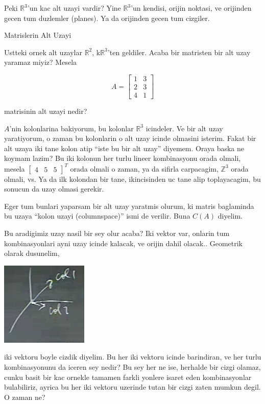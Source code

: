 \documentclass[12pt,fleqn]{article}\usepackage{../common}
\begin{document}
Peki $\mathbb{R}^3$'un kac alt uzayi vardir? Yine $\mathbb{R}^3$'un
kendisi, orijin noktasi, ve orijinden gecen tum duzlemler (planes). Ya da
orijinden gecen tum cizgiler. 

Matrislerin Alt Uzayi

Ustteki ornek alt uzaylar $\mathbb{R}^2$, k$\mathbb{R}^3$'ten
geldiler. Acaba bir matristen bir alt uzay yaramaz miyiz? Mesela 

$$  A =
\left[\begin{array}{rr}
1 & 3 \\
2 & 3 \\
4 & 1 
\end{array}\right]
 $$

matrisinin alt uzayi nedir? 

$A$'nin kolonlarina bakiyorum, bu kolonlar $\mathbb{R}^3$ icindeler. Ve bir
alt uzay yaratiyorum, o zaman bu kolonlarin o alt uzay icinde olmasini
isterim. Fakat bir alt uzaya iki tane kolon atip ``iste bu bir alt uzay''
diyemem. Oraya baska ne koymam lazim? Bu iki kolonun her turlu lineer
kombinasyonu orada olmali, mesela $ \left[\begin{array}{rrr}4 & 5 &
    5\end{array}\right]^T$ orada olmali o zaman, ya da sifirla carpacagim,
$\mathbb{Z}^3$ orada olmali, vs. Ya da ilk kolondan bir tane, ikincisinden
uc tane alip toplayacagim, bu sonucun da uzay olmasi gerekir. 

Eger tum bunlari yaparsam bir alt uzay yaratmis olurum, ki matris
baglaminda bu uzaya ``kolon uzayi (columnspace)'' ismi de verilir. Buna
$C(A)$ diyelim. 

Bu aradigimiz uzay nasil bir sey olur acaba? Iki vektor var, onlarin tum
kombinasyonlari ayni uzay icinde kalacak, ve orijin dahil
olacak.. Geometrik olarak dusunelim,

\includegraphics[height=4cm]{5_05.png}

iki vektoru boyle cizdik diyelim. Bu her iki vektoru icinde barindiran, ve
her turlu kombinasyonunu da iceren sey nedir? Bu sey her ne ise, herhalde
bir cizgi olamaz, cunku basit bir kac ornekle tamamen farkli yonlere isaret
eden kombinasyonlar bulabiliriz, ayrica bu her iki vektoru uzerinde tutan
bir cizgi zaten mumkun degil. O zaman ne? 
\end{document}

